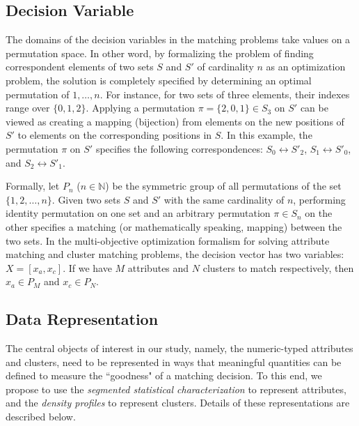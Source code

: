 \subsection{Decision Variable}
\label{sec:variables}
The domains of the decision variables in the matching problems take values on a permutation space. In other word, by formalizing the problem of finding correspondent elements of two sets $S$ and $S'$ of cardinality $n$ as an optimization problem, the solution is completely specified by determining an optimal permutation of ${1,\ldots,n}$. For instance, for two sets of three elements, their indexes range over $\{0, 1, 2\}$. Applying a permutation $\pi =\{2, 0, 1\} \in S_3$ on $S'$ can be viewed as creating a mapping (bijection) from elements on the new positions of $S'$ to elements on the corresponding positions in $S$. %
In this example, the permutation $\pi$ on $S'$ specifies the following correspondences: $S_0 \leftrightarrow S'_2$, $S_1 \leftrightarrow S'_0$, and $S_2 \leftrightarrow S'_1$.

Formally, let $P_n$ ($n\in \mathbb{N}$) be the symmetric group of all permutations of the set $\{1, 2, \ldots, n\}$. Given two sets $S$ and $S'$ with the same cardinality of $n$, performing identity permutation on one set and an arbitrary permutation $\pi \in S_n$ on the other specifies a matching (or mathematically speaking, mapping) between the two sets.
In the multi-objective optimization formalism for solving attribute matching and cluster matching problems, the decision vector has two variables: $X=[x_a, x_c]$. If we have $M$ attributes and $N$ clusters to match respectively, then $x_a \in P_M$ and $x_c\in P_N$.


\subsection{Data Representation}
The central objects of interest in our study, namely, the numeric-typed attributes and clusters, need to be represented in ways that meaningful quantities can be defined to measure the ``goodness" of a matching decision. To this end, we propose to use the \emph{segmented statistical characterization} to represent attributes, and the \emph{density profiles} to represent clusters. Details of these representations are described below.
